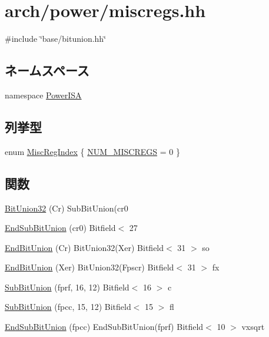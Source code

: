 \hypertarget{power_2miscregs_8hh}{
\section{arch/power/miscregs.hh}
\label{power_2miscregs_8hh}
}
{\ttfamily \#include \char`\"{}base/bitunion.hh\char`\"{}}\par
\subsection*{ネームスペース}
\begin{DoxyCompactItemize}
\item 
namespace \hyperlink{namespacePowerISA}{PowerISA}
\end{DoxyCompactItemize}
\subsection*{列挙型}
\begin{DoxyCompactItemize}
\item 
enum \hyperlink{namespacePowerISA_a1e522017e015d4c7efd6b2360143aa67}{MiscRegIndex} \{ \hyperlink{namespacePowerISA_a1e522017e015d4c7efd6b2360143aa67a7d1d86545746c83e719e24556985648a}{NUM\_\-MISCREGS} =  0
 \}
\end{DoxyCompactItemize}
\subsection*{関数}
\begin{DoxyCompactItemize}
\item 
\hyperlink{namespacePowerISA_ada69dcc10a02a7ceda35af957c434551}{BitUnion32} (Cr) SubBitUnion(cr0
\item 
\hyperlink{namespacePowerISA_ae2d645019d37ae932cad3b1435ebe638}{EndSubBitUnion} (cr0) Bitfield$<$ 27
\item 
\hyperlink{namespacePowerISA_a4a1bb83cbbdd34b9536fd20979976f34}{EndBitUnion} (Cr) BitUnion32(Xer) Bitfield$<$ 31 $>$ so
\item 
\hyperlink{namespacePowerISA_ac66016fe59d55012354269c3c5af1d1e}{EndBitUnion} (Xer) BitUnion32(Fpscr) Bitfield$<$ 31 $>$ fx
\item 
\hyperlink{namespacePowerISA_a8751f506ec057d848f6276c80b7c5f78}{SubBitUnion} (fprf, 16, 12) Bitfield$<$ 16 $>$ c
\item 
\hyperlink{namespacePowerISA_ab41ae2df93e0b6619beec050ee522e8d}{SubBitUnion} (fpcc, 15, 12) Bitfield$<$ 15 $>$ fl
\item 
\hyperlink{namespacePowerISA_aed02f125b7f5d4836bf0489108247f55}{EndSubBitUnion} (fpcc) EndSubBitUnion(fprf) Bitfield$<$ 10 $>$ vxsqrt
\end{DoxyCompactItemize}
